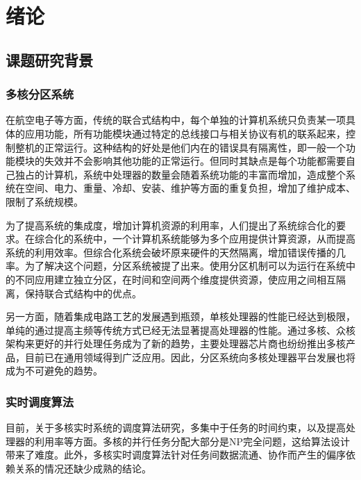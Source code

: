 ﻿%
\chapter{绪论}


\section{课题研究背景}

\subsection{多核分区系统}
在航空电子等方面，传统的联合式结构中，每个单独的计算机系统只负责某一项具体的应用功能，所有功能模块通过特定的总线接口与相关协议有机的联系起来，控制整机的正常运行。这种结构的好处是他们内在的错误具有隔离性，即一般一个功能模块的失效并不会影响其他功能的正常运行。但同时其缺点是每个功能都需要自己独占的计算机，系统中处理器的数量会随着系统功能的丰富而增加，造成整个系统在空间、电力、重量、冷却、安装、维护等方面的重复负担，增加了维护成本、限制了系统规模。

为了提高系统的集成度，增加计算机资源的利用率，人们提出了系统综合化的要求。在综合化的系统中，一个计算机系统能够为多个应用提供计算资源，从而提高系统的利用效率。但综合化系统会破坏原来硬件的天然隔离，增加错误传播的几率。为了解决这个问题，分区系统被提了出来。使用分区机制可以为运行在系统中的不同应用建立独立分区，在时间和空间两个维度提供资源，使应用之间相互隔离，保持联合式结构中的优点。

另一方面，随着集成电路工艺的发展遇到瓶颈，单核处理器的性能已经达到极限，单纯的通过提高主频等传统方式已经无法显著提高处理器的性能。通过多核、众核架构来更好的并行处理任务成为了新的趋势，主要处理器芯片商也纷纷推出多核产品，目前已在通用领域得到广泛应用。因此，分区系统向多核处理器平台发展也将成为不可避免的趋势。


\subsection{实时调度算法}


目前，关于多核实时系统的调度算法研究，多集中于任务的时间约束，以及提高处理器的利用率等方面。多核的并行任务分配大部分是NP完全问题，这给算法设计带来了难度。此外，多核实时调度算法针对任务间数据流通、协作而产生的偏序依赖关系的情况还缺少成熟的结论。


